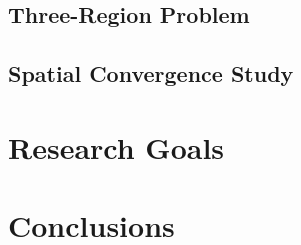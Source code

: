 \documentclass[12pt]{article}
\newcommand{\refdir}{../dissertation}
\begin{document}
\subsection{Three-Region Problem\label{sec:threeregion}}


\subsection{Spatial Convergence Study\label{sec:convergence}}


\section{Research Goals\label{sec:goals}}


\section{Conclusions\label{sec:conclusions}}




\end{document}

